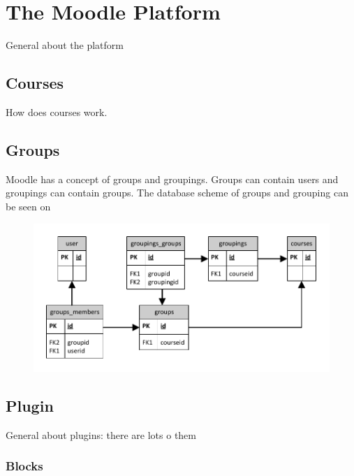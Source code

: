 
\section{The Moodle Platform}
\label{sec:moodleplatform}
	General about the platform






\subsection{Courses}
	How does courses work.






\subsection{Groups}
Moodle has a concept of groups and groupings. Groups can contain users and groupings can contain groups. The database scheme of groups and grouping can be seen on 

\begin{figure}
	\centering
		\includegraphics[width=\textwidth]{images/moodlegroups}
	\label{fig:moodlegroupsandgroupings}
\end{figure}




\subsection{Plugin}
	General about plugins: there are lots o them 




	\subsubsection{Blocks}





